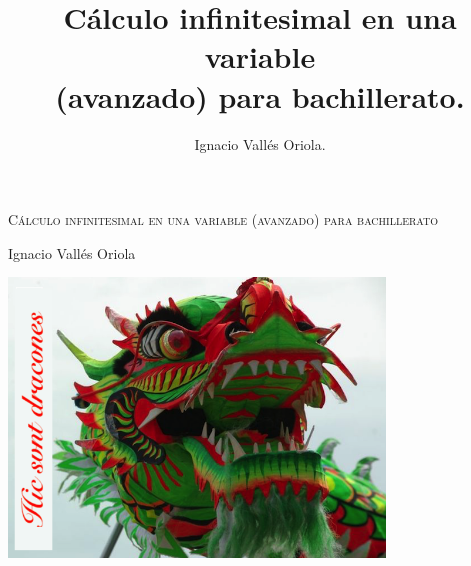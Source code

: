 \documentclass[a5paper, 10pt, spanish]{book}
\title{Cálculo infinitesimal en una variable \\ (avanzado) para bachillerato.}
\author{Ignacio Vallés Oriola.}
\date{}
\numberwithin{equation}{chapter}
\numberwithin{lema}{chapter}
\numberwithin{teor}{chapter}
\numberwithin{coro}{chapter}
\numberwithin{prop}{chapter}
\numberwithin{defi}{chapter}
\numberwithin{axio}{chapter}
\numberwithin{ejem}{chapter}
\numberwithin{ejre}{chapter}
\numberwithin{ejer}{chapter}
\numberwithin{ayud}{chapter}
\numberwithin{solu}{chapter}
\begin{document}
\begin{titlepage}
	\centering
	\vspace*{\fill}
	{\scshape\LARGE Cálculo infinitesimal en una variable (avanzado) para bachillerato \par}
	\vspace{1cm}
	{\Large Ignacio Vallés Oriola \par}
	\vspace{3cm}
	\includegraphics[width=0.75\textwidth]{imagenes/hic-svnt-dracones}
	\vspace{3cm}
\end{titlepage}

\tableofcontents















\appendix

		
\end{document}
